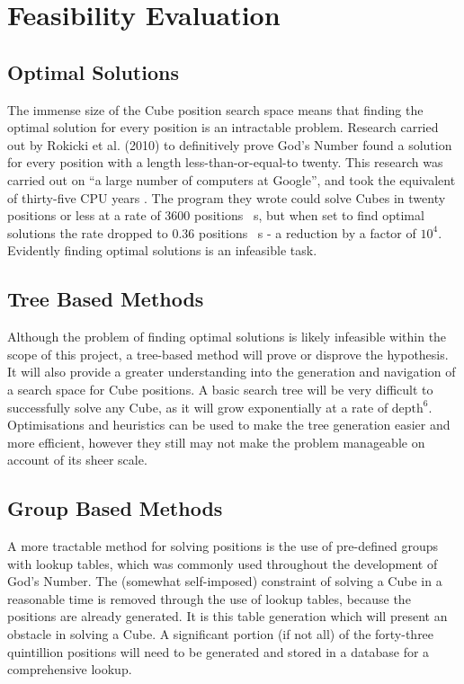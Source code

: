 \documentclass{report}
\begin{document}
    \section{Feasibility Evaluation}
    \subsection{Optimal Solutions}
    
	The immense size of the Cube position search space means that finding the optimal solution for every position is an intractable problem. Research carried out by Rokicki et al. (2010) to definitively prove God's Number found a solution for every position with a length less-than-or-equal-to twenty. This research was carried out on \enquote{a large number of computers at Google}, and took the equivalent of thirty-five CPU years \cite{Rokicki2010}. The program they wrote could solve Cubes in twenty positions or less at a rate of 3600 positions \si{\per\second}, but when set to find optimal solutions the rate dropped to 0.36 positions \si{\per\second} - a reduction by a factor of $10^4$. Evidently finding optimal solutions is an infeasible task.
    
	\subsection{Tree Based Methods}
	
	Although the problem of finding optimal solutions is likely infeasible within the scope of this project, a tree-based method will prove or disprove the hypothesis. It will also provide a greater understanding into the generation and navigation of a search space for Cube positions. A basic search tree will be very difficult to successfully solve any Cube, as it will grow exponentially at a rate of $\text{depth}^6$. Optimisations and heuristics can be used to make the tree generation easier and more efficient, however they still may not make the problem manageable on account of its sheer scale.
	
    \subsection{Group Based Methods}
    
    A more tractable method for solving positions is the use of pre-defined groups with lookup tables, which was commonly used throughout the development of God's Number. The (somewhat self-imposed) constraint of solving a Cube in a reasonable time is removed through the use of lookup tables, because the positions are already generated. It is this table generation which will present an obstacle in solving a Cube. A significant portion (if not all) of the forty-three quintillion positions will need to be generated and stored in a database for a comprehensive lookup.
    
\end{document}
